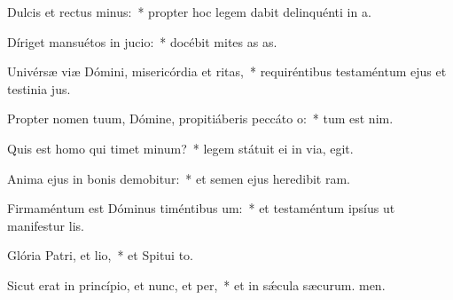 \item Dulcis et rectus minus:~* propter hoc legem dabit delinquénti in a.
\item Díriget mansuétos in jucio:~* docébit mites as as.
\item Univérsæ viæ Dómini, misericórdia et ritas,~* requiréntibus testaméntum ejus et testinia jus.
\item Propter nomen tuum, Dómine, propitiáberis peccáto o:~* tum est nim.
\item Quis est homo qui timet minum?~* legem státuit ei in via,  egit.
\item Anima ejus in bonis demobitur:~* et semen ejus heredibit ram.
\item Firmaméntum est Dóminus timéntibus um:~* et testaméntum ipsíus ut manifestur lis.
\item Glória Patri, et lio,~* et Spitui to.
\item Sicut erat in princípio, et nunc, et per,~* et in sǽcula sæcurum. men.
